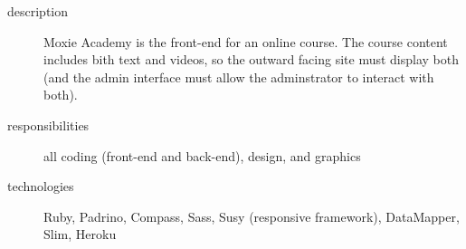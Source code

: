 \documentclass{article}
\begin{document}
\begin{multicols}{2}

\begin{description}
  \item[description] Moxie Academy is the front-end for an online 
    course.  The course content includes bith text and videos, so the 
    outward facing site must display both (and the admin interface 
    must allow the adminstrator to interact with both).
  \item[responsibilities] all coding (front-end and back-end), design, and graphics
  \item[technologies] Ruby, Padrino, Compass, Sass, Susy (responsive framework), DataMapper, Slim, Heroku
\end{description}

\vfill
\columnbreak
{}
\end{multicols}
\end{document}
